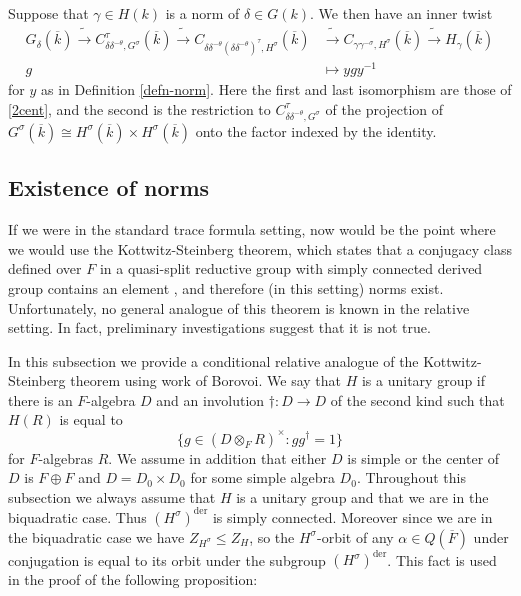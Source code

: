 \documentclass[12pt]{amsart}
\theoremstyle{remark}
\numberwithin{equation}{section}
\newcommand{\lto}{\longrightarrow}
\theoremstyle{definition}
\renewcommand{\bar}{\overline}
\numberwithin{equation}{subsection}
\begin{document}
Suppose that $\gamma \in H(k)$ is a norm of $\delta \in G(k)$. We then have an inner twist
\begin{align} \label{norm-twist}
G_{\delta}(\bar{k}) \tilde{\lto}C_{\delta\delta^{-\theta},G^{\sigma}}^{\tau}(\bar{k})
\tilde{\lto} C_{\delta\delta^{-\theta}(\delta\delta^{-\theta})^{\tau},H^{\sigma}}(\bar{k})&\tilde{\lto}C_{\gamma\gamma^{-\sigma},H^{\sigma}}(\bar{k}) \tilde{\lto}H_{\gamma}(\bar{k})\\
\nonumber g &\longmapsto y g y^{-1}
\end{align}
for $y$ as in Definition \ref{defn-norm}.  Here the first and last
isomorphism are those of \eqref{2cent}, and the second is the restriction to $C^{\tau}_{\delta \delta^{-\theta},G^{\sigma}}$
of the projection of $G^{\sigma}(\bar{k}) \cong H^{\sigma}(\bar{k}) \times H^{\sigma}(\bar{k})$ onto the factor indexed by the identity.


\subsection{Existence of norms}

\label{ssec-norm-exist}

If we were in the standard trace formula setting, now would be the point where we
would use the Kottwitz-Steinberg theorem, which states that a conjugacy class defined over $F$ in a quasi-split reductive group with simply
connected derived group contains an element \cite{KottRatConj}, and therefore (in this setting) norms exist.  Unfortunately, no general analogue of this theorem is known in the relative setting.  In fact, preliminary investigations suggest that it is not true.

In this subsection we provide a conditional relative analogue of the Kottwitz-Steinberg theorem using work of Borovoi.
We say that $H$ is a unitary group if there is an $F$-algebra $D$ and an involution $\dagger:D \to D$ of the second kind such that $H(R)$ is equal to
$$
\{ g\in (D \otimes_F R)^{\times}: gg^{\dagger}=1\}
$$
for $F$-algebras $R$.  We assume in addition that either $D$ is simple or the center of $D$ is $F \oplus F$ and $D=D_0 \times D_0$ for some simple algebra $D_0$.  Throughout this subsection we always assume that $H$ is a unitary group and that we are in the biquadratic case.  Thus $(H^{\sigma})^{\mathrm{der}}$ is simply connected.  Moreover since we are in the biquadratic case we have $Z_{H^{\sigma}} \leq Z_{H}$, so the $H^{\sigma}$-orbit of any $\alpha \in Q(\bar{F})$ under conjugation is equal to its orbit under the subgroup $(H^{\sigma})^{\mathrm{der}}$.  This fact is used in the proof of the following proposition:
\end{document}
